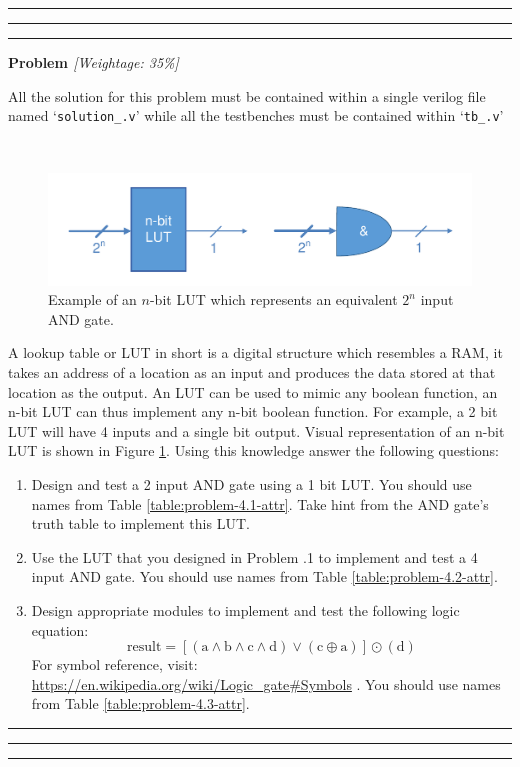 \documentclass[a4paper,10pt]{article}
\theoremstyle{mytheor}
\newcounter{problemNumber}
\newcommand {
  \insertProblem}[2]{
  \vspace{0.5cm}
  \hrule \hrule \hrule
  \vspace{0.3cm}
  
  {
    \setlength{\parindent}{0}

    {
      \color{greatblue}
      \textbf{\Large{Problem \theproblemNumber}}
      \hfill
      \textit{[Weightage: #1]}
    }

    {
      \centering
      \begin{center}
        \lfseries \footnotesize All the solution for this problem
        must be contained within a single verilog file named
        `\texttt{solution\_\theproblemNumber.v}' while all the
        testbenches must be contained within
          `\texttt{tb\_\theproblemNumber.v}'
        \end{center}
      }
      
    }
    
  \vspace{6pt}\\#2

  \addtocounter{problemNumber}{1}

  \vspace{0.2cm}
  \hrule \hrule \hrule
  \vspace{0.5cm}
}
\newcommand{\amurl}[1]{%
  {\color{blue}\url{#1}}
}
\begin{document}
 \insertProblem {35\%} {
   \begin{figure}[!h] \centering  
     \includegraphics[width=0.8\linewidth]{./resources/and-LUT.pdf} 
     \caption{Example of an $n$-bit LUT which represents an equivalent
       $2^n$ input AND gate.}
     \label{Fig:n-bit-and-lut} 
   \end{figure}
   
   A lookup table or LUT in short is a digital structure which
   resembles a RAM, it takes an address of a location as an input and
   produces the data stored at that location as the output. An LUT can
   be used to mimic any boolean function, an n-bit LUT can thus
   implement any n-bit boolean function. For example, a 2 bit LUT will
   have 4 inputs and a single bit output. Visual representation of an
   n-bit LUT is shown in Figure \ref{Fig:n-bit-and-lut}. Using this
   knowledge answer the following questions:

   \begin{enumerate}
     \item Design and test a 2 input AND gate using a 1 bit LUT. You
       should use names from Table \ref{table:problem-4.1-attr}. Take
       hint from the AND gate's truth table to implement this LUT.
     \item Use the LUT that you designed in Problem
       \theproblemNumber.1 to implement and test a 4 input AND
       gate. You should use names from Table
       \ref{table:problem-4.2-attr}.
     \item Design appropriate modules to implement and test the
       following logic equation:
       \begin{equation}
         \text{result} = [(\text{a} \land \text{b} \land \text{c}
           \land \text{d}) \lor (\text{c} \oplus \text{a})] \odot
         (\text{d})
       \end{equation}
       For symbol reference, visit:
       \amurl{https://en.wikipedia.org/wiki/Logic_gate#Symbols}. You 
       should use names from Table \ref{table:problem-4.3-attr}.
   \end{enumerate}

}
\end{document}
